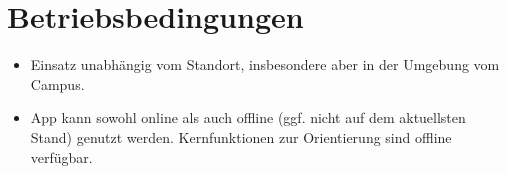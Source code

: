 \section{Betriebsbedingungen}

\begin{itemize}
	\item Einsatz unabhängig vom Standort, insbesondere aber in der Umgebung vom \Gls{Campus}.
	\item App kann sowohl online als auch offline (ggf. nicht auf  dem aktuellsten Stand) genutzt werden. Kernfunktionen zur Orientierung sind offline verfügbar.
\end{itemize}